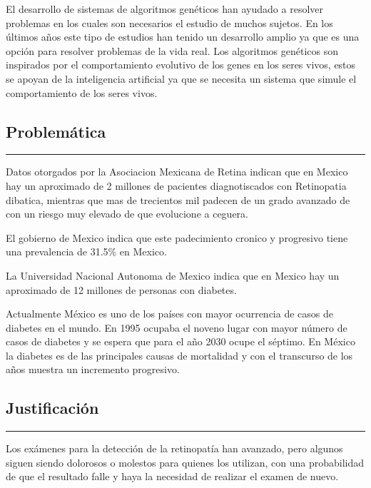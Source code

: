\documentclass[12pt,letterpaper]{article}
\begin{document}
El desarrollo de sistemas de algoritmos genéticos han ayudado a resolver problemas en los cuales son necesarios el estudio de muchos sujetos.\cite{Merino2019} En los últimos años este tipo de estudios han tenido un desarrollo amplio ya que es una opción para resolver problemas de la vida real.
Los algoritmos genéticos son inspirados por el comportamiento evolutivo de los genes en los seres vivos, estos se apoyan de la inteligencia artificial ya que se necesita un sistema que simule el comportamiento de los seres vivos.\cite{Diagnosis4799}


\newpage
\begin{center}
	\section{Problemática}
	\hrule
\end{center}
Datos otorgados por la Asociacion Mexicana de Retina indican que en Mexico hay un aproximado de 2 millones de pacientes diagnotiscados con Retinopatia dibatica, mientras que mas de trecientos mil padecen de un grado avanzado de con un riesgo muy elevado de que evolucione a ceguera.

El gobierno de Mexico indica que este padecimiento cronico y progresivo tiene una prevalencia de 31.5\% en Mexico.

La Universidad Nacional Autonoma de Mexico indica que en Mexico hay un aproximado de 12 millones de personas con diabetes.

Actualmente México es uno de los países con mayor ocurrencia de casos de diabetes en el mundo. En 1995 ocupaba el noveno lugar con mayor número de casos de diabetes y se espera que para el año 2030 ocupe el séptimo\cite{Mexico.Estudio2011}. En México la diabetes es de las principales causas de mortalidad y con el transcurso de los años muestra un incremento progresivo.\cite{CarmenDubonPeniche2010}
\\
\newpage
\begin{center}
	\section{Justificación}
	\hrule
\end{center}

Los exámenes para la detección de la retinopatía han avanzado, pero algunos siguen siendo dolorosos o molestos para quienes los utilizan, con una probabilidad de que el resultado falle y haya la necesidad de realizar el examen de nuevo.
\end{document}

